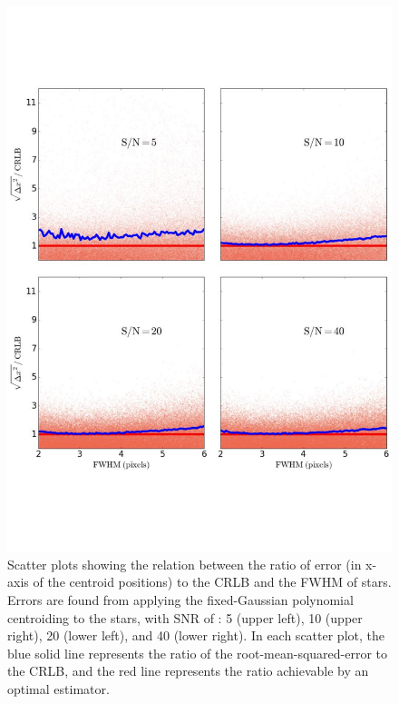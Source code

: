 \documentclass[onecolumn]{aastex61}
\newcommand{\todo}[1]{{\textcolor{dred}{ #1}}}
\begin{document}
\begin{figure}[p]~\\
\begin{center}
\includegraphics[width=0.65\linewidth]{new_fwhm_polynomial.pdf}
\caption{\todo{Scatter plots showing the relation between the ratio of error (in x-axis of the centroid positions) to the CRLB and the FWHM of stars.
Errors are found from applying the fixed-Gaussian polynomial centroiding to the stars, with SNR  of : 5 (upper left), 10 (upper right), 20 (lower left), and 40 (lower right). In each scatter plot, the blue solid line represents the ratio of the root-mean-squared-error to the CRLB, and the red line represents the ratio achievable by an optimal estimator.}}\label{7}
\end{center}
\end{figure}
\end{document}
